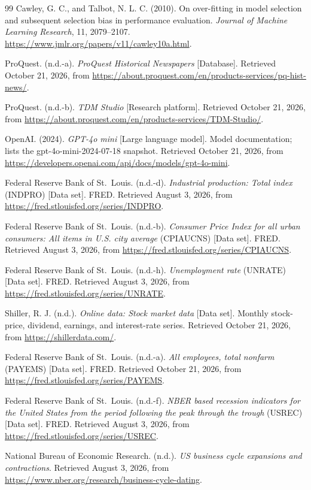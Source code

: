 \documentclass[iicol,pdflatex,sn-mathphys-num]{sn-jnl}
\begin{document}
\begin{thebibliography}{99}
Cawley, G. C., and Talbot, N. L. C. (2010). On over-fitting in model selection and subsequent selection bias in performance evaluation. \textit{Journal of Machine Learning Research}, 11, 2079--2107.
\url{https://www.jmlr.org/papers/v11/cawley10a.html}.

ProQuest. (n.d.-a). \textit{ProQuest Historical Newspapers} [Database]. Retrieved October 21, 2026, from
\url{https://about.proquest.com/en/products-services/pq-hist-news/}.

ProQuest. (n.d.-b). \textit{TDM Studio} [Research platform]. Retrieved October 21, 2026, from
\url{https://about.proquest.com/en/products-services/TDM-Studio/}.

OpenAI. (2024). \textit{GPT-4o mini} [Large language model]. Model documentation; lists the gpt-4o-mini-2024-07-18 snapshot. Retrieved October 21, 2026, from
\url{https://developers.openai.com/api/docs/models/gpt-4o-mini}.

Federal Reserve Bank of St.\ Louis. (n.d.-d). \textit{Industrial production: Total index} (INDPRO) [Data set]. FRED. Retrieved August 3, 2026, from
\url{https://fred.stlouisfed.org/series/INDPRO}.

Federal Reserve Bank of St.\ Louis. (n.d.-b). \textit{Consumer Price Index for all urban consumers: All items in U.S. city average} (CPIAUCNS) [Data set]. FRED. Retrieved August 3, 2026, from
\url{https://fred.stlouisfed.org/series/CPIAUCNS}.

Federal Reserve Bank of St.\ Louis. (n.d.-h). \textit{Unemployment rate} (UNRATE) [Data set]. FRED. Retrieved August 3, 2026, from
\url{https://fred.stlouisfed.org/series/UNRATE}.

Shiller, R. J. (n.d.). \textit{Online data: Stock market data} [Data set]. Monthly stock-price, dividend, earnings, and interest-rate series. Retrieved October 21, 2026, from
\url{https://shillerdata.com/}.

Federal Reserve Bank of St.\ Louis. (n.d.-a). \textit{All employees, total nonfarm} (PAYEMS) [Data set]. FRED. Retrieved October 21, 2026, from
\url{https://fred.stlouisfed.org/series/PAYEMS}.

Federal Reserve Bank of St.\ Louis. (n.d.-f). \textit{NBER based recession indicators for the United States from the period following the peak through the trough} (USREC) [Data set]. FRED. Retrieved August 3, 2026, from
\url{https://fred.stlouisfed.org/series/USREC}.

National Bureau of Economic Research. (n.d.). \textit{US business cycle expansions and contractions}. Retrieved August 3, 2026, from
\url{https://www.nber.org/research/business-cycle-dating}.

\end{thebibliography}
\endgroup
\end{document}
